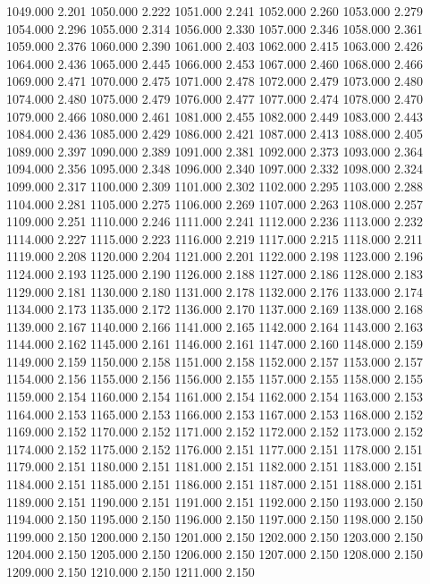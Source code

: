 1049.000 2.201 
1050.000 2.222 
1051.000 2.241 
1052.000 2.260 
1053.000 2.279 
1054.000 2.296 
1055.000 2.314 
1056.000 2.330 
1057.000 2.346 
1058.000 2.361 
1059.000 2.376 
1060.000 2.390 
1061.000 2.403 
1062.000 2.415 
1063.000 2.426 
1064.000 2.436 
1065.000 2.445 
1066.000 2.453 
1067.000 2.460 
1068.000 2.466 
1069.000 2.471 
1070.000 2.475 
1071.000 2.478 
1072.000 2.479 
1073.000 2.480 
1074.000 2.480 
1075.000 2.479 
1076.000 2.477 
1077.000 2.474 
1078.000 2.470 
1079.000 2.466 
1080.000 2.461 
1081.000 2.455 
1082.000 2.449 
1083.000 2.443 
1084.000 2.436 
1085.000 2.429 
1086.000 2.421 
1087.000 2.413 
1088.000 2.405 
1089.000 2.397 
1090.000 2.389 
1091.000 2.381 
1092.000 2.373 
1093.000 2.364 
1094.000 2.356 
1095.000 2.348 
1096.000 2.340 
1097.000 2.332 
1098.000 2.324 
1099.000 2.317 
1100.000 2.309 
1101.000 2.302 
1102.000 2.295 
1103.000 2.288 
1104.000 2.281 
1105.000 2.275 
1106.000 2.269 
1107.000 2.263 
1108.000 2.257 
1109.000 2.251 
1110.000 2.246 
1111.000 2.241 
1112.000 2.236 
1113.000 2.232 
1114.000 2.227 
1115.000 2.223 
1116.000 2.219 
1117.000 2.215 
1118.000 2.211 
1119.000 2.208 
1120.000 2.204 
1121.000 2.201 
1122.000 2.198 
1123.000 2.196 
1124.000 2.193 
1125.000 2.190 
1126.000 2.188 
1127.000 2.186 
1128.000 2.183 
1129.000 2.181 
1130.000 2.180 
1131.000 2.178 
1132.000 2.176 
1133.000 2.174 
1134.000 2.173 
1135.000 2.172 
1136.000 2.170 
1137.000 2.169 
1138.000 2.168 
1139.000 2.167 
1140.000 2.166 
1141.000 2.165 
1142.000 2.164 
1143.000 2.163 
1144.000 2.162 
1145.000 2.161 
1146.000 2.161 
1147.000 2.160 
1148.000 2.159 
1149.000 2.159 
1150.000 2.158 
1151.000 2.158 
1152.000 2.157 
1153.000 2.157 
1154.000 2.156 
1155.000 2.156 
1156.000 2.155 
1157.000 2.155 
1158.000 2.155 
1159.000 2.154 
1160.000 2.154 
1161.000 2.154 
1162.000 2.154 
1163.000 2.153 
1164.000 2.153 
1165.000 2.153 
1166.000 2.153 
1167.000 2.153 
1168.000 2.152 
1169.000 2.152 
1170.000 2.152 
1171.000 2.152 
1172.000 2.152 
1173.000 2.152 
1174.000 2.152 
1175.000 2.152 
1176.000 2.151 
1177.000 2.151 
1178.000 2.151 
1179.000 2.151 
1180.000 2.151 
1181.000 2.151 
1182.000 2.151 
1183.000 2.151 
1184.000 2.151 
1185.000 2.151 
1186.000 2.151 
1187.000 2.151 
1188.000 2.151 
1189.000 2.151 
1190.000 2.151 
1191.000 2.151 
1192.000 2.150 
1193.000 2.150 
1194.000 2.150 
1195.000 2.150 
1196.000 2.150 
1197.000 2.150 
1198.000 2.150 
1199.000 2.150 
1200.000 2.150 
1201.000 2.150 
1202.000 2.150 
1203.000 2.150 
1204.000 2.150 
1205.000 2.150 
1206.000 2.150 
1207.000 2.150 
1208.000 2.150 
1209.000 2.150 
1210.000 2.150 
1211.000 2.150 
